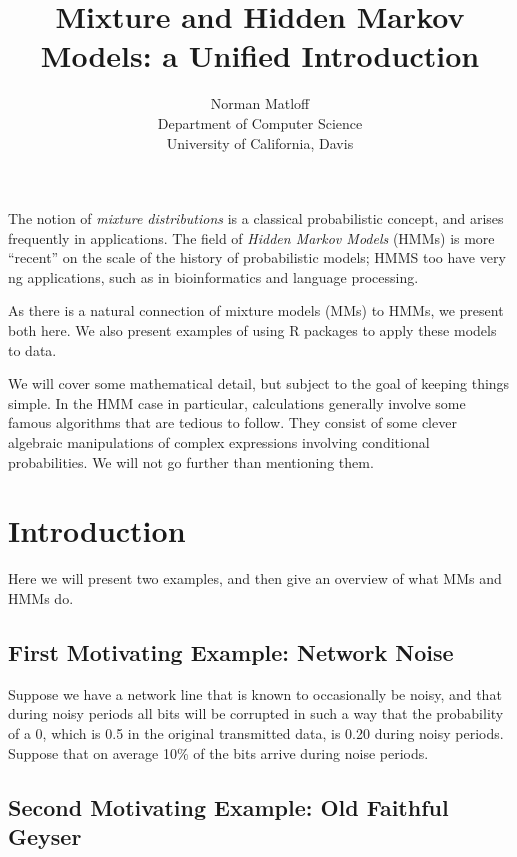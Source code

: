 \documentclass[11pt]{article}
\begin{document}
 

\title{Mixture and Hidden Markov Models: a Unified Introduction}
\author{Norman Matloff \\
   Department of Computer Science \\
   University of California, Davis}

\maketitle

The notion of \textit{mixture distributions} is a classical
probabilistic concept, and arises frequently in applications.  The field
of \textit{Hidden Markov Models} (HMMs) is more ``recent'' on the scale
of the history of probabilistic models; HMMS too have very ng
applications, such as in bioinformatics and language processing.

As there is a natural connection of mixture models (MMs) to HMMs, we
present both here.  We also present examples of using R packages to
apply these models to data.

We will cover some mathematical detail, but subject to the goal of
keeping things simple.  In the HMM case in particular, calculations
generally involve some famous algorithms that are tedious to follow.
They consist of some clever algebraic manipulations of complex
expressions involving conditional probabilities.  We will not go further
than mentioning them.

\section{Introduction}

Here we will present two examples, and then give an overview of what MMs
and HMMs do.

\subsection{First Motivating Example:  Network Noise}

Suppose we have a network line that is known to occasionally be
noisy, and that during noisy periods all bits will be corrupted in such
a way that the probability of a 0, which is 0.5 in the original
transmitted data, is 0.20 during noisy periods.  Suppose that on average
10\% of the bits arrive during noise periods.

\subsection{Second Motivating Example:  Old Faithful Geyser}
\end{document}
